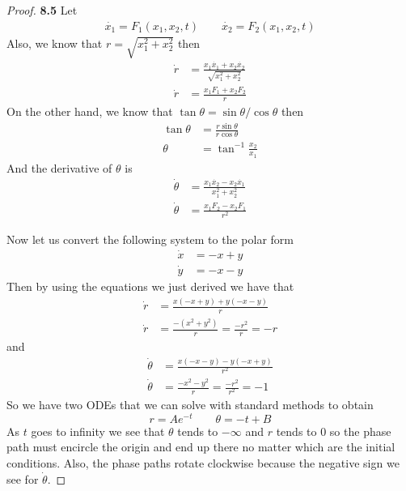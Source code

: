 \documentclass[11pt]{article}
\theoremstyle{definition}
\begin{document}
	\begin{proof}{\textbf{8.5}}
        Let
        \begin{align*}
            \dot{x_1} = F_1(x_1,x_2,t) \quad\quad \dot{x_2} = F_2(x_1,x_2,t)
        \end{align*}
        Also, we know that $r = \sqrt{x_1^2 + x_2^2}$ then
        \begin{align*}
            \dot{r} &= \frac{x_1\dot{x_1} + x_2\dot{x_2}}{\sqrt{x_1^2 + x_2^2}}\\
            \dot{r} &= \frac{x_1F_1 + x_2F_2}{r}
        \end{align*}
        On the other hand, we know that $\tan\theta = \sin\theta/\cos\theta$ then
        \begin{align*}
            \tan\theta &= \frac{r\sin\theta}{r\cos\theta}\\
            \theta &= \tan^{-1}\frac{x_2}{x_1}
        \end{align*}
        And the derivative of $\theta$ is
        \begin{align*}
            \dot{\theta} &= \frac{x_1\dot{x_2} - x_2\dot{x_1}}{x_1^2 + x_2^2}\\
            \dot{\theta} &= \frac{x_1F_2 - x_2F_1}{r^2}
        \end{align*}

        Now let us convert the following system to the polar form
        \begin{align*}
            \dot{x} &= -x+y\\
            \dot{y} &= -x-y
        \end{align*}
        Then by using the equations we just derived we have that
        \begin{align*}
            \dot{r} &= \frac{x(-x+y) + y(-x-y)}{r}\\
            \dot{r} &= \frac{-(x^2+y^2)}{r} = \frac{-r^2}{r} = -r
        \end{align*}
        and
        \begin{align*}
            \dot{\theta} &= \frac{x(-x-y) - y(-x+y)}{r^2}\\
            \dot{\theta} &= \frac{-x^2-y^2}{r} = \frac{-r^2}{r^2} = -1
        \end{align*}
        So we have two ODEs that we can solve with standard methods to obtain
        $$r = Ae^{-t} \quad\quad \theta = -t + B$$
        As $t$ goes to infinity we see  that $\theta$ tends to $-\infty$ and $r$
        tends to $0$ so the phase path must encircle the origin and end up there
        no matter which are the initial conditions. Also, the phase paths
        rotate clockwise because the negative sign we see for $\dot{\theta}$.
    \end{proof}
\end{document}
